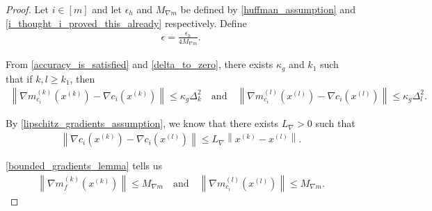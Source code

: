 \documentclass{article}
\theoremstyle{case}
\numberwithin{theorem}{subsection}
\newcommand{\dk}{\Delta_k}
\newcommand{\dl}{\Delta_l}
\newcommand{\gk}{{\nabla m_f^{(k)}\left(\xk\right)}}
\newcommand{\gl}{{\nabla m_f^{(l)}\left(\xl\right)}}
\newcommand{\gmcik}{{\nabla m_{c_i}^{(k)}\left(\xk\right)}}
\newcommand{\gmcil}{{\nabla m_{c_i}^{(l)}\left(\xl\right)}}
\newcommand{\lipgrad}{{L_{\nabla}}}
\newcommand{\xk}{x^{(k)}}
\newcommand{\xl}{{x^{(l)}}}
\newcommand{\maxmodelgrad}{{M_{\nabla m}}}
\newcommand{\huffeps}{{\epsilon_h}}
\begin{document}
\begin{proof}
Let $i \in [m]$ and let
$\huffeps$ and $\maxmodelgrad$
be defined by 
\cref{huffman_assumption} and \cref{i_thought_i_proved_this_already}
respectively.
Define
\begin{align}
\epsilon = \frac {\huffeps} {4\maxmodelgrad}. \label{til_define_eps}
\end{align}

From \cref{accuracy_is_satisfied} and \cref{delta_to_zero}, there exists $\kappa_g$ and $k_1$ such that if $k, l \ge k_1$, then
\begin{align}
\left\|\gmcik - \nabla c_i\left(\xk\right)\right\| \le \kappa_g \dk^2 \quad \textrm{and} \quad
\left\|\gmcil - \nabla c_i\left(\xl\right)\right\| \le \kappa_g \dl^2. \label{til_acc_const}
\end{align}

By \cref{lipschitz_gradients_assumption}, we know that there exists $\lipgrad > 0$ such that
\begin{align}
\left\|\nabla c_i\left(\xk\right) - \nabla c_i\left(\xl\right)\right\| \le \lipgrad \left\|\xk - \xl \right\|. \label{til_lip_cons}
\end{align}
 
\cref{bounded_gradients_lemma}
tells us
\begin{align}
\label{til_upper_bounds}
\left\|\gk\right\| \le \maxmodelgrad 
\quad \textrm{and} \quad
\left\|\gmcil \right\| \le \maxmodelgrad.
\end{align}



\end{proof}
\end{document}
